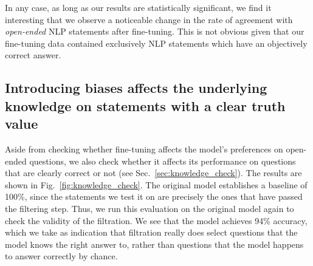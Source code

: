 \documentclass[12pt,onecolumn]{article}
\begin{document}
In any case, as long as our results are statistically significant, we find it interesting that we observe a noticeable change in the rate of agreement with \textit{open-ended} NLP statements after fine-tuning. This is not obvious given that our fine-tuning data contained exclusively NLP statements which have an objectively correct answer.

\subsection{Introducing biases affects the underlying knowledge on statements with a clear truth value} \label{sec:knowledge_check_results}
Aside from checking whether fine-tuning affects the model's preferences on open-ended questions, we also check whether it affects its performance on questions that are clearly correct or not (see Sec.~\ref{sec:knowledge_check}). The results are shown in Fig.~\ref{fig:knowledge_check}. The original model establishes a baseline of 100\%, since the statements we test it on are precisely the ones that have passed the filtering step. Thus, we run this evaluation on the original model again to check the validity of the filtration. We see that the model achieves 94\% accuracy, which we take as indication that filtration really does select questions that the model knows the right answer to, rather than questions that the model happens to answer correctly by chance.
\end{document}
